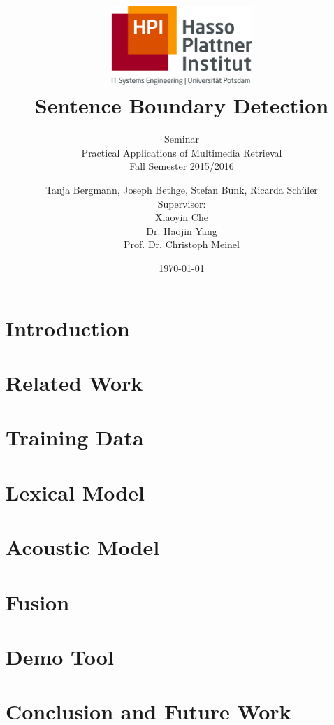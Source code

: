 \documentclass[a4paper,12pt,pagesize,headsepline,bibliography=totoc,titlepage]{scrartcl}
\title{
	\includegraphics*[width=0.4\textwidth]{img/hpi_logo.png}\\
	\vspace{24pt}
	Sentence Boundary Detection
}
\subtitle{
	Seminar\\
	Practical Applications of Multimedia Retrieval\\
	Fall Semester 2015/2016
}
\author{
	Tanja Bergmann, Joseph Bethge, Stefan Bunk, Ricarda Schüler\\[12pt]
	Supervisor:\\
    Xiaoyin Che\\
	Dr. Haojin Yang\\
	Prof. Dr. Christoph Meinel
}
\date{\today}
\begin{document}
\maketitle
\tableofcontents
\newpage

\section{Introduction}
\label{sec:introduction}


\section{Related Work}
\label{sec:related_work}


\section{Training Data}
\label{sec:training_data}


\section{Lexical Model}
\label{sec:lexical_model}


\section{Acoustic Model}
\label{sec:acoustic_model}


\section{Fusion}
\label{sec:fusion}


\section{Demo Tool}
\label{sec:demo}


\section{Conclusion and Future Work}
\label{sec:future}




\end{document}
